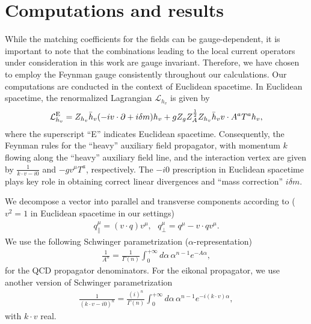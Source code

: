 \section{Computations and results}
\label{sec:oneloopcalc}
\label{sec:oneloop}
While the matching coefficients for the fields can be gauge-dependent, it is important to note that the combinations leading to the local current operators under consideration in this work are gauge invariant. Therefore, we have chosen to employ the Feynman gauge consistently throughout our calculations. Our computations are conducted in the context of Euclidean spacetime. In Euclidean spacetime, the renormalized Lagrangian $\mathcal{L}_{h_v}$ is given by
\begin{eqnarray}
\label{eq:extendLRenEuclidean}
\mathcal{L}_{h_v}^{\rm E} =Z_{h_v}\bar{h}_v (-iv\cdot \partial + i\delta m) h_v + gZ_gZ_A^{\frac{1}{2}}Z_{h_v} \bar{h}_v v\cdot A^{a}T^a h_v,
\end{eqnarray}
where the superscript ``E” indicates Euclidean spacetime. Consequently, 
the Feynman rules for the ``heavy” auxiliary field propagator, with momentum $k$ flowing along the ``heavy” auxiliary field line,  and the  interaction vertex are given by 
$\frac{1}{k\cdot v -i0}$ and $-gv^{\mu}T^a$, respectively. The $-i0$ prescription in Euclidean spacetime plays key role in obtaining correct linear divergences and ``mass correction”  $i\delta m$.

We decompose a vector into parallel and transverse components according to ($v^2=1$ in Euclidean spacetime in our settings)
\begin{eqnarray}
q_{\|}^{\mu} = (v\cdot q) v^{\mu}, \, \, \, \, q_{\perp}^{\mu} = q^{\mu} - v\cdot q v^{\mu}.
\end{eqnarray}
We use the following Schwinger parametrization ($\alpha$-representation)
\begin{eqnarray}
\label{eq:alphax}
\frac{1}{A^n} = \frac{1}{\Gamma(n)}\int_0^{+\infty} d\alpha\, \alpha^{n-1} e^{-A\alpha},
\end{eqnarray}
for the QCD propagator denominators. For the eikonal propagator, we use another version of Schwinger parametrization
\begin{eqnarray}
\label{eq:alphay}
\frac{1}{(k\cdot v- i0)^n} = \frac{(i)^n}{\Gamma(n)}\int_0^{+\infty} d\alpha\, \alpha^{n-1} e^{-i(k\cdot v)\alpha},
\end{eqnarray}
with $k\cdot v$  real. 


